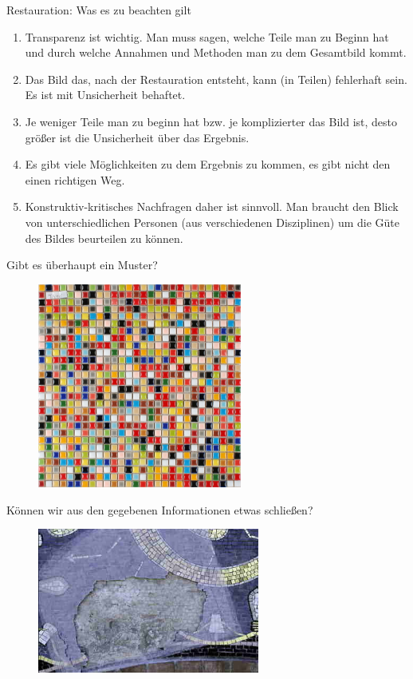 \documentclass[usenames,dvipsnames,handout]{beamer}
\begin{document}
\begin{frame}{Restauration: Was es zu beachten gilt}
\begin{enumerate}
\item{Transparenz ist wichtig. Man muss sagen, welche Teile man zu Beginn hat und durch welche 
Annahmen und Methoden man zu dem Gesamtbild kommt.}\pause
\item{Das Bild das, nach der Restauration entsteht, kann (in Teilen) fehlerhaft sein. Es ist mit Unsicherheit behaftet.}\pause
\item{Je weniger Teile man zu beginn hat bzw. je komplizierter das Bild ist, desto größer ist die Unsicherheit über das Ergebnis.}\pause
\item{Es gibt  viele Möglichkeiten zu dem Ergebnis zu kommen, es gibt nicht den einen richtigen Weg.}\pause
\item{Konstruktiv-kritisches Nachfragen daher ist sinnvoll. Man braucht den Blick von unterschiedlichen Personen (aus verschiedenen Disziplinen)
um die Güte des Bildes beurteilen zu können.}
\end{enumerate}
\end{frame}

\begin{frame}{Gibt es überhaupt ein Muster?}
     \begin{figure}[ht]
 	\centering
 	      \includegraphics[width=0.6\textwidth]{pattern.jpg}
 	\end{figure}
\end{frame}

\begin{frame}{Können wir aus den gegebenen Informationen etwas schließen?}
     \begin{figure}[ht]
 	\centering
 	      \includegraphics[width=0.65\textwidth]{incomplete2.jpg}
 	\end{figure}
\end{frame}
\end{document}
